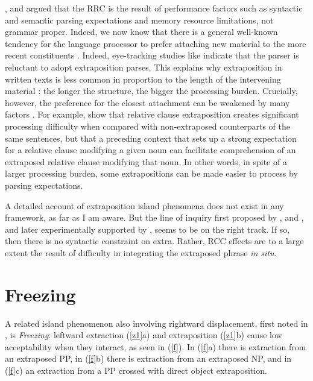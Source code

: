\documentclass[output=paper
 	        ,biblatex
                ,babelshorthands
                ,newtxmath
                ,draftmode
                ,colorlinks, citecolor=brown
]{langscibook}
\begin{document}
\citet{grosurrc}, \citet{gazdar} and \citet{stucky} argued that the RRC is the result of performance
factors such as syntactic and semantic parsing expectations and memory resource limitations, not
grammar proper.  Indeed, we now know that there is a general well-known tendency for the language
processor to prefer attaching new material to the more recent constituents
\citep{frazcl,gibetal,trax98,fodor02b,fernandez03}.  Indeed, eye-tracking studies like \citet{hnps}
indicate that the parser is reluctant to adopt extraposition parses.  This explains why
extraposition in written texts is less common in proportion to the length of the intervening
material \citep{UBDKKOS98b}: the longer the structure, the bigger the processing burden.  Crucially,
however, the preference for the closest attachment can be weakened by many factors
\citep{fernandez03,desmet,devic,carreras}.  For example, \citet{levyted} show that relative clause
extraposition creates significant processing difficulty when compared with non-extraposed
counterparts of the same sentences, but that a preceding context that sets up a strong expectation
for a relative clause modifying a given noun can facilitate comprehension of an extraposed relative
clause modifying that noun.  In other words, in spite of a larger processing burden, some
extrapositions can be made easier to process by parsing expectations.

A detailed account of extraposition island phenomena does not exist in any framework, as far as I am
aware. But the line of inquiry first proposed by \citet{grosurrc}, \citet{gazdar} and
\citet{stucky}, and later experimentally supported by \citet{levyted}, \citet{SS2013b-u} seems to be
on the right track. If so, then there is no syntactic constraint on {\sc extra}. Rather, RCC effects
are to a large extent the result of difficulty in integrating the extraposed phrase \emph{in situ}.

\section{Freezing}

A related island phenomenon also involving rightward displacement, first noted in
\citet[305]{Ross67}, is \emph{Freezing}: leftward extraction (\ref{z1}a) and extraposition
(\ref{z1}b) cause low acceptability when they interact, as seen in (\ref{f}). In (\ref{f}a) there is
extraction from an extraposed PP, in (\ref{f}b) there is extraction from an extraposed NP, and in
(\ref{f}c) an extraction from a PP crossed with direct object extraposition.
 
\end{document}
